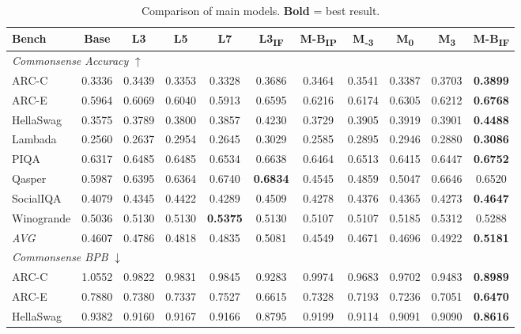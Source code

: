 
\begin{table}[htbp]
\centering
\setlength{\tabcolsep}{2.5pt}
\caption{Comparison of main models. \textbf{Bold} = best result.}
\label{tab:main_results}
\begin{tabular}{lcccccccccc}
\toprule
Bench & Base & L3 & L5 & L7 & L3\textsubscript{IF} & M-B\textsubscript{IP} & M\textsubscript{-3} & M\textsubscript{0} & M\textsubscript{3} & M-B\textsubscript{IF} \\
\midrule
\multicolumn{11}{l}{\textit{Commonsense Accuracy} $\uparrow$} \\
ARC-C & 0.3336 & 0.3439 & 0.3353 & 0.3328 & 0.3686 & 0.3464 & 0.3541 & 0.3387 & 0.3703 & \textbf{0.3899} \\
ARC-E & 0.5964 & 0.6069 & 0.6040 & 0.5913 & 0.6595 & 0.6216 & 0.6174 & 0.6305 & 0.6212 & \textbf{0.6768} \\
HellaSwag & 0.3575 & 0.3789 & 0.3800 & 0.3857 & 0.4230 & 0.3729 & 0.3905 & 0.3919 & 0.3901 & \textbf{0.4488} \\
Lambada & 0.2560 & 0.2637 & 0.2954 & 0.2645 & 0.3029 & 0.2585 & 0.2895 & 0.2946 & 0.2880 & \textbf{0.3086} \\
PIQA & 0.6317 & 0.6485 & 0.6485 & 0.6534 & 0.6638 & 0.6464 & 0.6513 & 0.6415 & 0.6447 & \textbf{0.6752} \\
Qasper & 0.5987 & 0.6395 & 0.6364 & 0.6740 & \textbf{0.6834} & 0.4545 & 0.4859 & 0.5047 & 0.6646 & 0.6520 \\
SocialIQA & 0.4079 & 0.4345 & 0.4422 & 0.4289 & 0.4509 & 0.4278 & 0.4376 & 0.4365 & 0.4273 & \textbf{0.4647} \\
Winogrande & 0.5036 & 0.5130 & 0.5130 & \textbf{0.5375} & 0.5130 & 0.5107 & 0.5107 & 0.5185 & 0.5312 & 0.5288 \\
\textit{AVG} & 0.4607 & 0.4786 & 0.4818 & 0.4835 & 0.5081 & 0.4549 & 0.4671 & 0.4696 & 0.4922 & \textbf{0.5181} \\
\midrule
\multicolumn{11}{l}{\textit{Commonsense BPB} $\downarrow$} \\
ARC-C & 1.0552 & 0.9822 & 0.9831 & 0.9845 & 0.9283 & 0.9974 & 0.9683 & 0.9702 & 0.9483 & \textbf{0.8989} \\
ARC-E & 0.7880 & 0.7380 & 0.7337 & 0.7527 & 0.6615 & 0.7328 & 0.7193 & 0.7236 & 0.7051 & \textbf{0.6470} \\
HellaSwag & 0.9382 & 0.9160 & 0.9167 & 0.9166 & 0.8795 & 0.9199 & 0.9114 & 0.9091 & 0.9090 & \textbf{0.8616} \\

\end{tabular}
\end{table}
